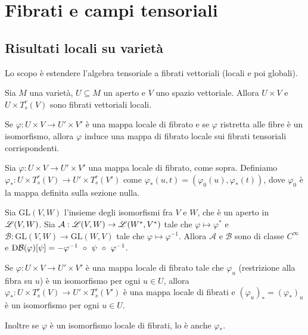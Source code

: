 \chapter{Fibrati e campi tensoriali}

\section{Risultati locali su varietà} %

Lo scopo è estendere l'algebra tensoriale a fibrati vettoriali (locali e poi globali).

Sia $M$ una varietà, $U\subseteq M$ un aperto e $V$ uno spazio vettoriale. Allora $U\times V$ e $U\times T_s^r(V)$ sono fibrati vettoriali locali.

Se $\varphi:U\times V \to U'\times V'$ è una mappa locale di fibrato e se $\varphi$ ristretta alle fibre è un isomorfismo, allora $\varphi$ induce una mappa di fibrato locale sui fibrati tensoriali corrispondenti.

\begin{definition} 
	Sia $\varphi:U\times V \to U'\times V'$ una mappa locale di fibrato, come sopra. Definiamo $\varphi_*: U \times T_s^r(V) \to U'\times T_s^r(V')$ come $\varphi_*(u,t) = (\varphi_0(u), \varphi_*(t))$, dove $\varphi_0$ è la mappa definita sulla sezione nulla.
\end{definition}

\begin{lemma} \label{lem:DualeEInversaRegolari}
	Sia $\mathrm {GL} (V,W)$ l'insieme degli isomorfismi fra $V$ e $W$, che è un aperto in $\mathscr L(V,W)$. Sia $\mathcal A:\mathscr L(V,W)\to \mathscr L(W^*,V^*)$ tale che $\varphi\mapsto \varphi^*$ e $\mathcal B: \mathrm {GL} (V,W) \to \mathrm {GL} (W,V)$ tale che $\varphi \mapsto \varphi^{-1}$. %
	Allora $\mathcal A$ e $\mathcal B$ sono di classe $C^\infty$ e $\mathrm D \mathcal B(\varphi)[\psi] = -\varphi^{-1}\ \circ\ \psi\ \circ\ \varphi^{-1}$.
\end{lemma}

\begin{proposition} \label{prop:DaIsomorfismoLocaleFibratiVettAIsomorfismoLocaleFibratiTens}
	Se $\varphi:U\times V\to U'\times V'$ è una mappa locale di fibrato tale che $\varphi_u$ (restrizione alla fibra su $u$) è un isomorfismo per ogni $u\in U$, allora $\varphi_*: U\times T_s^r(V)\to U'\times T_s^r(V')$ è una mappa locale di fibrati e $(\varphi_u)_* = (\varphi_*)_u$ è un isomorfismo per ogni $u\in U$.
	
	Inoltre se $\varphi$ è un isomorfismo locale di fibrati, lo è anche $\varphi_*$.
\end{proposition}

